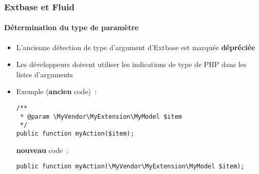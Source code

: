 %

\begin{frame}[fragile]
	\frametitle{Extbase et Fluid}
	\framesubtitle{Détermination du type de paramètre}


	\begin{itemize}
		\item L'ancienne détection de type d'argument d'Extbase est marquée \textbf{dépréciée}
		\item Les développeurs doivent utiliser les indications de type de PHP dans les listes d'arguments
		\item Exemple (\textbf{ancien} code)~:
\begin{lstlisting}
/**
 * @param \MyVendor\MyExtension\MyModel $item
 */
public function myAction($item);
\end{lstlisting}
			\textbf{nouveau} code~:
\begin{lstlisting}
public function myAction(\MyVendor\MyExtension\MyModel $item);
\end{lstlisting}

	\end{itemize}

\end{frame}

